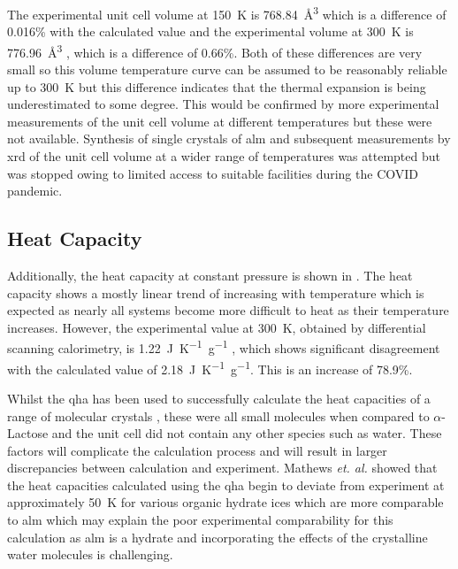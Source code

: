 The experimental unit cell volume at \SI{150}{K} is \SI{768.84}{\angstrom^3} \cite{Smith2005} which is a difference of 0.016\% with the calculated value and the experimental volume at \SI{300}{K} is \SI{776.96}{\angstrom^3} \cite{Schreyer2014}, which is a difference of 0.66\%. Both of these differences are very small so this volume temperature curve can be assumed to be reasonably reliable up to \SI{300}{K} but this difference indicates that the thermal expansion is being underestimated to some degree. This would be confirmed by more experimental measurements of the unit cell volume at different temperatures but these were not available. Synthesis of single crystals of \acrshort{alm} and subsequent measurements by \acrshort{xrd} of the unit cell volume at a wider range of temperatures was attempted but was stopped owing to limited access to suitable facilities during the COVID pandemic.

\subsection{Heat Capacity}
Additionally, the heat capacity at constant pressure is shown in . The heat capacity shows a mostly linear trend of increasing with temperature which is expected as nearly all systems become more difficult to heat as their temperature increases. However, the experimental value at \SI{300}{K}, obtained by differential scanning calorimetry, is \SI{1.22}{J K^{-1} g^{-1}} \cite{Kawaizumi1981}, which shows significant disagreement with the calculated value of \SI{2.18}{J K^{-1} g^{-1}}. This is an increase of 78.9\%. 

Whilst the \acrshort{qha} has been used to successfully calculate the heat capacities of a range of molecular crystals \cite{Cervinka2016}, these were all small molecules when compared to \(\alpha\)\nobreakdash-Lactose and the unit cell did not contain any other species such as water. These factors will complicate the calculation process and will result in larger discrepancies between calculation and experiment. Mathews \textit{et. al.} \cite{Mathews2020} showed that the heat capacities calculated using the \acrshort{qha} begin to deviate from experiment at approximately \SI{50}{K} for various organic hydrate ices which are more comparable to \acrshort{alm} which may explain the poor experimental comparability for this calculation as \acrshort{alm} is a hydrate and incorporating the effects of the crystalline water molecules is challenging. 

